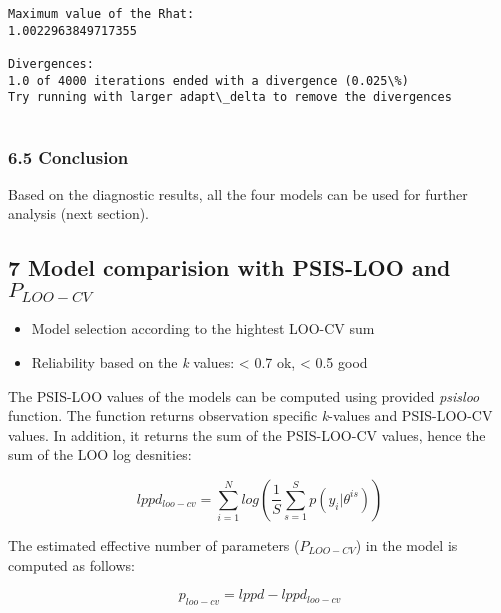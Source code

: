 \documentclass[11pt]{article}
\providecommand{\tightlist}{%
      \setlength{\itemsep}{0pt}\setlength{\parskip}{0pt}}
\begin{document}
    \begin{Verbatim}[commandchars=\\\{\}]
Maximum value of the Rhat: 
1.0022963849717355

Divergences:
1.0 of 4000 iterations ended with a divergence (0.025\%)
Try running with larger adapt\_delta to remove the divergences


    \end{Verbatim}

    \hypertarget{conclusion}{%
\subsubsection{6.5 Conclusion}\label{conclusion}}

Based on the diagnostic results, all the four models can be used for
further analysis (next section).

    \hypertarget{model-comparision-with-psis-loo-and-p_loo-cv}{%
\subsection{\texorpdfstring{7 Model comparision with PSIS-LOO and
\(P_{LOO-CV}\)}{7 Model comparision with PSIS-LOO and P\_\{LOO-CV\}}}\label{model-comparision-with-psis-loo-and-p_loo-cv}}

\begin{itemize}
\tightlist
\item
  Model selection according to the hightest LOO-CV sum
\item
  Reliability based on the \emph{k} values: \textless{} 0.7 ok,
  \textless{} 0.5 good
\end{itemize}

The PSIS-LOO values of the models can be computed using provided
\emph{psisloo} function. The function returns observation specific
\emph{k}-values and PSIS-LOO-CV values. In addition, it returns the sum
of the PSIS-LOO-CV values, hence the sum of the LOO log desnities:

\begin{equation*}
lppd_{loo-cv} = \sum_{i=1}^{N} log \left( \frac{1}{S} \sum_{s=1}^{S} p(y_i|\theta^{is}) \right)
\end{equation*}

The estimated effective number of parameters (\(P_{LOO-CV}\)) in the
model is computed as follows:

\begin{equation*}
p_{loo-cv} = lppd-lppd_{loo-cv} 
\end{equation*}
\end{document}
